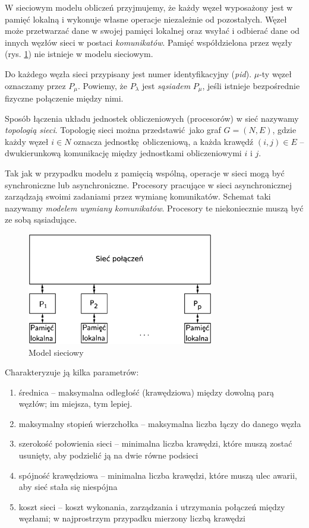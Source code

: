 W sieciowym modelu obliczeń przyjmujemy, że każdy węzeł wyposażony jest w pamięć lokalną i wykonuje własne operacje niezależnie od pozostałych. Węzeł może przetwarzać dane w swojej pamięci lokalnej oraz wsyłać i odbierać dane od innych węzłów sieci w postaci \emph{komunikatów}.  Pamięć współdzielona przez węzły (rys. \ref{fig:model_net}) nie istnieje w modelu sieciowym. 

Do każdego węzła sieci przypisany jest numer identyfikacyjny (\emph{pid}). \(\mu\)-ty węzeł oznaczamy przez \(P_\mu\). Powiemy, że \(P_\lambda\) jest \emph{sąsiadem} \(P_\mu\), jeśli istnieje bezpośrednie fizyczne połączenie między nimi.\cite{Golub}


Sposób łączenia układu jednostek obliczeniowych (procesorów) w sieć nazywamy \emph{topologią sieci}. Topologię sieci można przedstawić jako graf \(G=(N,E)\), gdzie każdy węzeł \(i\in N\) oznacza jednostkę obliczeniową, a każda krawędź \((i, j) \in E\) – dwukierunkową komunikację między jednostkami obliczeniowymi \(i\) i \(j\). 

Tak jak w przypadku modelu z pamięcią wspólną, operacje w sieci mogą być synchroniczne lub asynchroniczne. Procesory pracujące w sieci asynchronicznej zarządzają swoimi zadaniami przez wymianę komunikatów. Schemat taki nazywamy \emph{modelem wymiany komunikatów}. Procesory te niekoniecznie muszą być ze sobą sąsiadujące. 

\begin{figure}[h]
\centering
\includegraphics[width=22em]{images/Rys_net.eps}
\caption{Model sieciowy}
\label{fig:model_net}
\end{figure}

Charakteryzuje ją kilka parametrów:

\begin{enumerate}
 \item średnica – maksymalna odległość (krawędziowa) między dowolną parą węzłów; im miejsza, tym lepiej.
 \item maksymalny stopień wierzchołka – maksymalna liczba łączy do danego węzła
 \item szerokość połowienia sieci – minimalna liczba krawędzi, które muszą zostać usunięty, aby podzielić ją na dwie równe podsieci
 \item spójność krawędziowa – minimalna liczba krawędzi, które muszą ulec awarii, aby sieć stała się niespójna
 \item koszt sieci – koszt wykonania, zarządzania i utrzymania połączeń między węzłami; w najprostrzym przypadku mierzony liczbą krawędzi
\end{enumerate}


